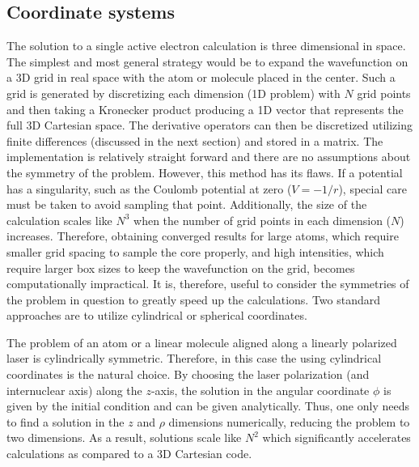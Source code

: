 \subsection{Coordinate systems} %
\label{sub:coordinate_systems}
The solution to a single active electron calculation is three dimensional in space. The simplest and most general strategy would be to expand the wavefunction on a 3D grid in real space with the atom or molecule placed in the center. Such a grid is generated by discretizing each dimension (1D problem) with $N$ grid points and then taking a Kronecker product producing a 1D vector that represents the full 3D Cartesian space. The derivative operators can then be discretized utilizing finite differences (discussed in the next section) and stored in a matrix. The implementation is relatively straight forward and there are no assumptions about the symmetry of the problem. However, this method has its flaws. If a potential has a singularity, such as the Coulomb potential at zero ($V=-1/r$), special care must be taken to avoid sampling that point. Additionally, the size of the calculation scales like $N^3$ when the number of grid points in each dimension ($N$) increases. Therefore, obtaining converged results for large atoms, which require smaller grid spacing to sample the core properly, and high intensities, which require larger box sizes to keep the wavefunction on the grid, becomes computationally impractical. 
It is, therefore, useful to consider the symmetries of the problem in question to greatly speed up the calculations. Two standard approaches are to utilize cylindrical or spherical coordinates. 

The problem of an atom or a linear molecule aligned along a linearly polarized laser is cylindrically symmetric. Therefore, in this case the using cylindrical coordinates is the natural choice. By choosing the laser polarization (and internuclear axis) along the $z$-axis, the solution in the angular coordinate $\phi$ is given by the initial condition and can be given analytically. Thus, one only needs to find a solution in the $z$ and $\rho$ dimensions numerically, reducing the problem to two dimensions. As a result, solutions scale like $N^2$ which significantly accelerates calculations as compared to a 3D Cartesian code. 

